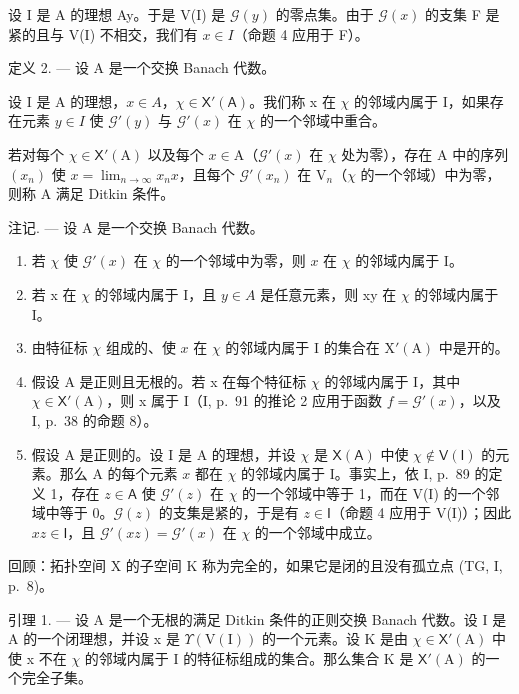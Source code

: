 设 I 是 A 的理想 Ay。于是 V(I) 是 \(\mathcal{G}(y)\) 的零点集。由于 \(\mathcal{G}(x)\) 的支集 F 是紧的且与 V(I) 不相交，我们有 \(x \in I\)（命题 4 应用于 F）。

定义 2. --- 设 A 是一个交换 Banach 代数。

设 I 是 A 的理想，\(x \in A\)，\(\chi \in \mathsf{X}'(\mathsf{A})\)。我们称 x 在 \(\chi\) 的邻域内属于 I，如果存在元素 \(y \in I\) 使 \(\mathcal{G}'(y)\) 与 \(\mathcal{G}'(x)\) 在 \(\chi\) 的一个邻域中重合。

若对每个 \(\chi \in \mathsf{X}'(\mathrm{A})\) 以及每个 \(x \in \mathrm{A}\)（\(\mathcal{G}'(x)\) 在 \(\chi\) 处为零），存在 A 中的序列 \((x_n)\) 使 \(x = \lim_{n \to \infty} x_n x\)，且每个 \(\mathcal{G}'(x_n)\) 在 \(\mathrm{V}_n\)（\(\chi\) 的一个邻域）中为零，则称 A 满足 Ditkin 条件。

注记. --- 设 A 是一个交换 Banach 代数。

\begin{enumerate}
\def\labelenumi{\arabic{enumi})}
\item
  若 \(\chi\) 使 \(\mathcal{G}'(x)\) 在 \(\chi\) 的一个邻域中为零，则 \(x\) 在 \(\chi\) 的邻域内属于 I。
\item
  若 x 在 \(\chi\) 的邻域内属于 I，且 \(y \in A\) 是任意元素，则 xy 在 \(\chi\) 的邻域内属于 I。
\item
  由特征标 \(\chi\) 组成的、使 \(x\) 在 \(\chi\) 的邻域内属于 I 的集合在 \(\mathrm{X}'(\mathrm{A})\) 中是开的。
\item
  假设 A 是正则且无根的。若 x 在每个特征标 \(\chi\) 的邻域内属于 I，其中 \(\chi \in \mathsf{X}'(\mathrm{A})\)，则 x 属于 I（I, p.~91 的推论 2 应用于函数 \(f = \mathcal{G}'(x)\)，以及 I, p.~38 的命题 8）。
\item
  假设 A 是正则的。设 I 是 A 的理想，并设 \(\chi\) 是 \(\mathsf{X}(\mathsf{A})\) 中使 \(\chi\notin\mathsf{V}(\mathsf{I})\) 的元素。那么 A 的每个元素 \(x\) 都在 \(\chi\) 的邻域内属于 I。事实上，依 I, p.~89 的定义 1，存在 \(z\in\mathsf{A}\) 使 \(\mathcal{G}'(z)\) 在 \(\chi\) 的一个邻域中等于 1，而在 V(I) 的一个邻域中等于 0。\(\mathcal{G}(z)\) 的支集是紧的，于是有 \(z\in\mathsf{I}\)（命题 4 应用于 V(I)）；因此 \(xz\in\mathsf{I}\)，且 \(\mathcal{G}'(xz)=\mathcal{G}'(x)\) 在 \(\chi\) 的一个邻域中成立。
\end{enumerate}

回顾：拓扑空间 X 的子空间 K 称为完全的，如果它是闭的且没有孤立点 (TG, I, p.~8)。

引理 1. --- 设 A 是一个无根的满足 Ditkin 条件的正则交换 Banach 代数。设 I 是 A 的一个闭理想，并设 x 是 \(\Upsilon(\mathrm{V}(\mathrm{I}))\) 的一个元素。设 K 是由 \(\chi \in \mathsf{X}'(\mathrm{A})\) 中使 x 不在 \(\chi\) 的邻域内属于 I 的特征标组成的集合。那么集合 K 是 \(\mathsf{X}'(\mathrm{A})\) 的一个完全子集。

